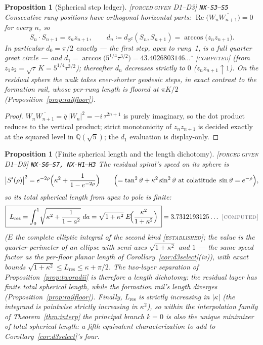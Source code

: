 \documentclass[11pt]{article}
\newcommand{\tagFD}{\textcolor{cF}{\textsc{[forced}}\,\textcolor{cD}{\textsc{given D1--D3]}}}
\newcommand{\tagC}{\textcolor{cC}{\textsc{[computed]}}}
\newcommand{\tagE}{\textcolor{cE}{\textsc{[established]}}}
\newcommand{\hx}[1]{\textcolor{cC}{\footnotesize\texttt{#1}}}
\newcommand{\Q}{\mathbb{Q}}
\DeclareMathOperator{\Rea}{Re}
\theoremstyle{plain}
\newtheorem{proposition}[theorem]{Proposition}
\theoremstyle{definition}
\theoremstyle{remark}
\begin{document}
\begin{proposition}[Spherical step ledger]\label{prop:sphsteps}\tagFD{} \hx{NX-S3--S5}
Consecutive rung positions have orthogonal horizontal parts:
$\Rea\bigl(W_n\overline{W_{n+1}}\bigr)=0$ for every $n$, so
\[
S_n\cdot S_{n+1}=z_nz_{n+1},
\qquad
d_n\coloneqq d_{S^2}(S_n,S_{n+1})=\arccos\bigl(z_nz_{n+1}\bigr).
\]
In particular $d_0=\pi/2$ \emph{exactly} --- the first step, apex to
rung~1, is a full quarter great circle --- and
$d_1=\arccos\bigl(5^{1/4}\tau^{3/2}\bigr)=43.4026803146\ldots^\circ$
\tagC{} (from $z_1z_2=\sqrt\tau\,K=5^{1/4}\tau^{3/2}$); thereafter $d_n$
decreases strictly to $0$ ($z_nz_{n+1}\uparrow1$). On the residual sphere
the walk takes ever-shorter geodesic steps, in exact contrast to the
formation rail, whose per-rung length is floored at $\pi K/2$
(Proposition~\ref{prop:railfloor}).
\end{proposition}

\begin{proof}
$W_n\overline{W_{n+1}}=\overline q\,|W_n|^2=-i\,\tau^{2n+1}$ is purely
imaginary, so the dot product reduces to the vertical product; strict
monotonicity of $z_nz_{n+1}$ is decided exactly at the squared level in
$\Q(\sqrt5)$; the $d_1$ evaluation is display-only.
\end{proof}

\begin{proposition}[Finite spherical length and the length dichotomy]\label{prop:sphlength}\tagFD{} \hx{NX-S6--S7, NX-H1--H3}
The residual spiral's speed on its sphere is
\[
\bigl|S'(\rho)\bigr|^2
= e^{-2\rho}\Bigl(\kappa^2+\frac{1}{1-e^{-2\rho}}\Bigr)
\qquad\Bigl(=\tan^2\vartheta+\kappa^2\sin^2\vartheta\ \text{at colatitude}\
\sin\vartheta=e^{-\rho}\Bigr),
\]
so its total spherical length from apex to pole is finite:
\[
\boxed{\;L_{\mathrm{res}}
=\int_0^1\!\sqrt{\kappa^2+\frac{1}{1-a^2}}\;da
=\sqrt{1+\kappa^2}\;E\!\Bigl(\frac{\kappa^2}{1+\kappa^2}\Bigr)\;}
=3.7312193125\ldots\ \tagC{}
\]
($E$ the complete elliptic integral of the second kind \tagE{}; the value
is the quarter-perimeter of an ellipse with semi-axes $\sqrt{1+\kappa^2}$
and $1$ --- the same speed factor as the per-floor planar length of
Corollary~\ref{cor:d3select}(iv)), with exact bounds
$\sqrt{1+\kappa^2}\le L_{\mathrm{res}}\le\kappa+\pi/2$. The two-layer
separation of Proposition~\ref{prop:tworadii} is therefore a \emph{length
dichotomy}: the residual layer has finite total spherical length, while the
formation rail's length diverges (Proposition~\ref{prop:railfloor}).
Finally, $L_{\mathrm{res}}$ is strictly increasing in $|\kappa|$ (the
integrand is pointwise strictly increasing in $\kappa^2$), so within the
interpolation family of Theorem~\ref{thm:interp} the principal branch
$k=0$ is also the \emph{unique minimizer of total spherical length}: a
fifth equivalent characterization to add to
Corollary~\ref{cor:d3select}'s four.
\end{proposition}
\end{document}
